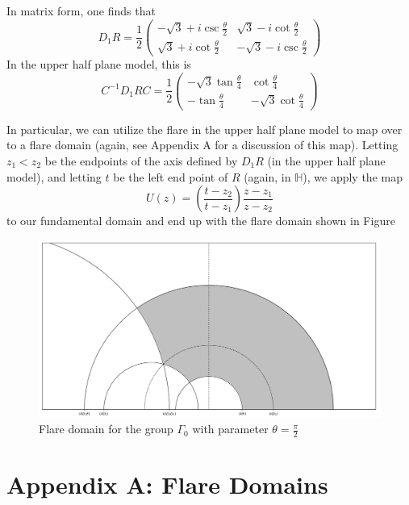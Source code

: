 \documentclass[]{article}
\begin{document}
In matrix form, one finds that
$$
D_1R =
\frac{1}{2}
\begin{pmatrix}
-\sqrt{3} + i\csc\frac{\theta}{2} & \sqrt{3} - i\cot\frac{\theta}{2} \\
\sqrt{3} + i\cot\frac{\theta}{2} & -\sqrt{3} - i\csc\frac{\theta}{2}
\end{pmatrix}
$$
In the upper half plane model, this is
$$
C^{-1}D_1RC =
\frac{1}{2}
\begin{pmatrix}
-\sqrt{3}\tan\frac{\theta}{4} & \cot\frac{\theta}{4} \\
-\tan\frac{\theta}{4} & -\sqrt{3}\cot\frac{\theta}{4}
\end{pmatrix}
$$

In particular, we can utilize the flare in the upper half plane model to map over to a flare domain (again, see Appendix A for a discussion of this map).
Letting $z_1 < z_2$ be the endpoints of the axis defined by $D_1R$ (in the upper half plane model), and letting $t$ be the left end point of $R$ (again, in $\mathbb{H}$), we apply the map
$$
U(z) = \left( \frac{t - z_2}{t - z_1} \right) \frac{z - z_1}{z - z_2}
$$
to our fundamental domain and end up with the flare domain shown in Figure
\begin{figure}
	\centering
	\includegraphics[width=0.7\linewidth]{cover_flare.png}
	\caption{Flare domain for the group $\Gamma_0$ with parameter $\theta = \frac{\pi}{2}$}
	\label{cover_flare}
\end{figure}

\clearpage

\section*{Appendix A: Flare Domains}
\end{document}
